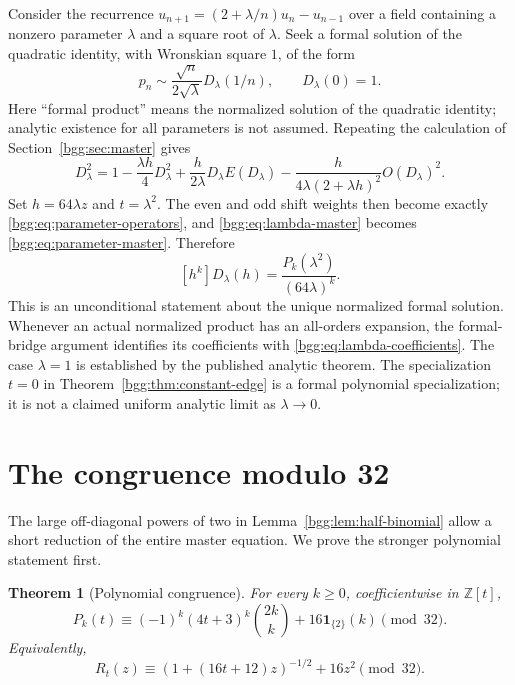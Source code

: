 \documentclass[11pt,a4paper]{article}
\numberwithin{equation}{section}
\newtheorem{theorem}{Theorem}[section]
\theoremstyle{definition}
\theoremstyle{remark}
\theoremstyle{definition}
\newcommand{\Z}{\mathbb Z}
\newcommand{\ind}{\mathbf 1}
\begin{document}
Consider the recurrence $u_{n+1}=(2+\lambda/n)u_n-u_{n-1}$ over a field
containing a nonzero parameter $\lambda$ and a square root of $\lambda$.
Seek a formal solution of the quadratic identity, with Wronskian square $1$,
of the form
\[
 p_n\sim\frac{\sqrt n}{2\sqrt\lambda}D_\lambda(1/n),
 \qquad D_\lambda(0)=1.
\]
Here ``formal product'' means the normalized solution of the quadratic
identity; analytic existence for all parameters is not assumed. Repeating
the calculation of Section~\ref{bgg:sec:master} gives
\begin{equation}\label{bgg:eq:lambda-master}
 D_\lambda^2=1-\frac{\lambda h}{4}D_\lambda^2
 +\frac{h}{2\lambda}D_\lambda E(D_\lambda)
 -\frac{h}{4\lambda(2+\lambda h)^2}O(D_\lambda)^2.
\end{equation}
Set $h=64\lambda z$ and $t=\lambda^2$. The even and odd shift weights then
become exactly \eqref{bgg:eq:parameter-operators}, and
\eqref{bgg:eq:lambda-master} becomes \eqref{bgg:eq:parameter-master}. Therefore
\begin{equation}\label{bgg:eq:lambda-coefficients}
 [h^k]D_\lambda(h)=\frac{P_k(\lambda^2)}{(64\lambda)^k}.
\end{equation}
This is an unconditional statement about the unique normalized formal
solution. Whenever an actual normalized product has an all-orders expansion,
the formal-bridge argument identifies its coefficients with
\eqref{bgg:eq:lambda-coefficients}. The case $\lambda=1$ is established by the
published analytic theorem. The specialization $t=0$ in
Theorem~\ref{bgg:thm:constant-edge} is a formal polynomial specialization; it is
not a claimed uniform analytic limit as $\lambda\to0$.

\section{The congruence modulo 32}
\label{bgg:sec:congruence}

The large off-diagonal powers of two in Lemma~\ref{bgg:lem:half-binomial} allow a
short reduction of the entire master equation. We prove the stronger
polynomial statement first.

\begin{theorem}[Polynomial congruence]\label{bgg:thm:polynomial-congruence}
For every $k\ge0$, coefficientwise in $\Z[t]$,
\begin{equation}\label{bgg:eq:polynomial-congruence}
 P_k(t)\equiv(-1)^k(4t+3)^k\binom{2k}{k}
             +16\ind_{\{2\}}(k)\pmod{32}.
\end{equation}
Equivalently,
\begin{equation}\label{bgg:eq:series-congruence}
 R_t(z)\equiv(1+(16t+12)z)^{-1/2}+16z^2\pmod{32}.
\end{equation}
\end{theorem}
\end{document}

